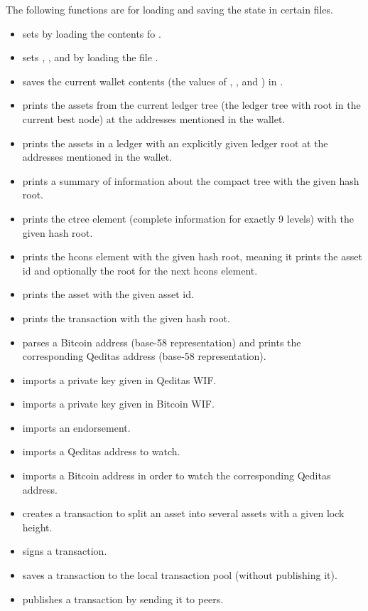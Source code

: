 The following functions are for loading and saving the state in certain files.
\begin{itemize}
\item {} sets {} by loading the contents fo {}.
\item {} sets {}, {},
{}
and {}
by loading the file {}.
\item {} saves the current wallet contents
(the values of {}, {},
{}
and {})
in {}.
\item {} prints the assets from the current ledger tree (the ledger tree with root in the current best node) at the addresses
mentioned in the wallet.
\item {} prints the assets in a ledger with an explicitly given ledger root
at the addresses mentioned in the wallet.
\item {} prints a summary of information about the compact tree with the given hash root.
\item {} prints the ctree element (complete information for exactly 9 levels) with the given hash root.
\item {} prints the hcons element with the given hash root, meaning it prints the asset id and optionally the root for the next hcons element.
\item {} prints the asset with the given asset id.
\item {} prints the transaction with the given hash root.
\item {} parses a Bitcoin address (base-58 representation) and prints the corresponding Qeditas address (base-58 representation).
\item {} imports a private key given in Qeditas WIF.
\item {} imports a private key given in Bitcoin WIF.
\item {} imports an endorsement.
\item {} imports a Qeditas address to watch.
\item {} imports a Bitcoin address in order to watch the corresponding Qeditas address.
\item {} creates a transaction to split an asset
into several assets with a given lock height.
\item {} signs a transaction.
\item {} saves a transaction to the local transaction pool (without publishing it).
\item {} publishes a transaction by sending it to peers.
\end{itemize}

